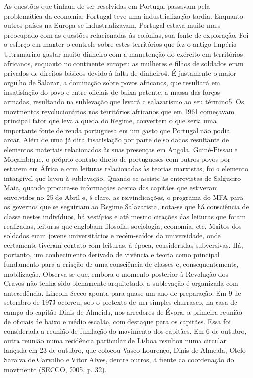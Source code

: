 \documentclass[../DISSERTACAO_MAIN.tex]{subfiles}
\begin{document}
As questões que tinham de ser resolvidas em Portugal passavam pela problemática da economia. Portugal teve uma industrialização tardia. Enquanto outros países na Europa se industrializavam, Portugal estava muito mais preocupado com as questões relacionadas às colônias, sua fonte de exploração. Foi o esforço em manter o controle sobre estes territórios que fez o antigo Império Ultramarino gastar muito dinheiro com a manutenção do exército em territórios africanos, enquanto no continente europeu as mulheres e filhos de soldados eram privados de direitos básicos devido à falta de dinheiro4. É justamente o maior orgulho de Salazar, a dominação sobre povos africanos, que resultará em insatisfação do povo e entre oficiais de baixa patente, a massa das forças armadas, resultando na sublevação que levará o salazarismo ao seu término5.
Os movimentos revolucionários nos territórios africanos que em 1961 começavam, principal fator que leva à queda do Regime, convertem o que seria uma importante fonte de renda portuguesa em um gasto que Portugal não podia arcar. Além de uma já dita insatisfação por parte de soldados resultante de elementos materiais relacionados às suas presenças em Angola, Guiné-Bissau e Moçambique, o próprio contato direto de portugueses com outros povos por estarem em África  e com leituras relacionadas às teorias marxistas, foi o elemento intangível que levou à sublevação. Quando se assiste às entrevistas de Salgueiro Maia, quando procura-se informações acerca dos capitães que estiveram envolvidos no 25 de Abril e, é claro, as reivindicações, o programa do MFA para os governos que se seguiriam ao Regime Salazarista, nota-se que há consciência de classe nestes indivíduos, há vestígios e até mesmo citações das leituras que foram realizadas, leituras que englobam filosofia, sociologia, economia, etc. Muitos dos soldados eram jovens universitários e recém-saídos da universidade, onde certamente tiveram contato com leituras, à época, consideradas subversivas. Há, portanto, um conhecimento derivado de vivência e teoria como principal fundamento para a criação de uma consciência de classes e, consequentemente, mobilização. Observa-se que, embora o momento posterior à Revolução dos Cravos não tenha sido plenamente arquitetado, a sublevação é organizada com antecedência. Lincoln Secco aponta para quase um ano de preparação:
Em 9 de setembro de 1973 ocorreu, sob o pretexto de um simples churrasco, na casa de campo do capitão Dinis de Almeida, nos arredores de Évora, a primeira reunião de oficiais de baixo e médio escalão, com destaque para os capitães. Essa foi considerada a reunião de fundação do movimento dos capitães. Em 6 de outubro, outra reunião numa residência particular de Lisboa resultou numa circular lançada em 23 de outubro, que colocou Vasco Lourenço, Dinis de Almeida, Otelo Saraiva de Carvalho e Vitor Alves, dentre outros, à frente da coordenação do movimento (SECCO, 2005, p. 32).
\end{document}
